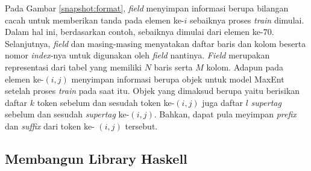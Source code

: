 
Pada Gambar \ref{snapshot:format}, \textit{field}  menyimpan informasi berupa
bilangan cacah untuk memberikan tanda pada elemen ke-$i$ sebaiknya proses \textit{train} dimulai.
Dalam hal ini, berdasarkan contoh, sebaiknya dimulai dari elemen ke-$70$.
Selanjutnya, \textit{field}  dan  masing-masing menyatakan daftar baris dan
kolom beserta nomor \textit{index}-nya untuk digunakan oleh \textit{field}  nantinya.
\textit{Field}  merupakan representasi dari tabel yang memiliki $N$ baris serta $M$
kolom.
Adapun  pada elemen ke-$(i, j)$ menyimpan informasi berupa objek untuk model MaxEnt
setelah proses \textit{train} pada  saat itu.
Objek yang dimaksud berupa  yaitu berisikan daftar $k$ token sebelum dan sesudah token
ke-$(i, j)$ juga daftar $l$ \textit{supertag} sebelum dan sesudah \textit{supertag} ke-$(i, j)$.
Bahkan,  dapat pula meyimpan \textit{prefix} dan \textit{suffix} dari token ke-
$(i, j)$ tersebut.

\subsection{Membangun Library Haskell}

